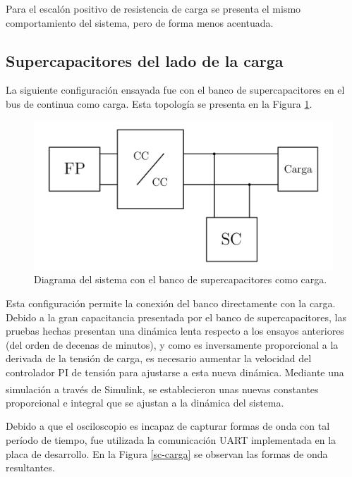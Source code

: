 Para el escalón positivo de resistencia de carga se presenta el mismo comportamiento del sistema, pero de forma menos acentuada.

\subsection{Supercapacitores del lado de la carga}

La siguiente configuración ensayada fue con el banco de supercapacitores en el bus de continua como carga. Esta topología se presenta en la Figura \ref{esquema-sc-carga}.

\begin{figure}[hbt!]
  \centering
  \includegraphics[width=0.55\columnwidth]{Imágenes/Ensayos/Con módulos de almacenamiento/Supercapacitores/Como carga/Diagrama del ensayo.pdf}
  \caption{Diagrama del sistema con el banco de supercapacitores como carga.}
  \label{esquema-sc-carga}
\end{figure}

Esta configuración permite la conexión del banco directamente con la carga. Debido a la gran capacitancia presentada por el banco de supercapacitores, las pruebas hechas presentan una dinámica lenta respecto a los ensayos anteriores (del orden de decenas de minutos), y como es inversamente proporcional a la derivada de la tensión de carga, es necesario aumentar la velocidad del controlador PI de tensión para ajustarse a esta nueva dinámica. Mediante una simulación a través de Simulink\textsuperscript\textregistered\hspace{0.6pt}, se establecieron unas nuevas constantes proporcional e integral que se ajustan a la dinámica del sistema.

Debido a que el osciloscopio es incapaz de capturar formas de onda con tal período de tiempo, fue utilizada la comunicación UART implementada en la placa de desarrollo. En la Figura \ref{sc-carga} se observan las formas de onda resultantes.

